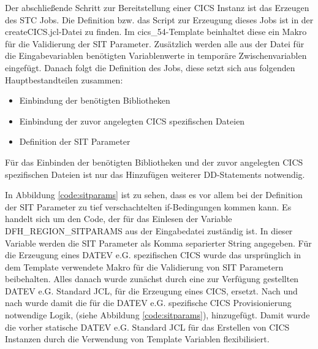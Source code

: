 \begin{minipage}{\linewidth}

\end{minipage}

Der abschließende Schritt zur Bereitstellung einer CICS Instanz ist das Erzeugen des STC Jobs.
Die Definition bzw. das Script zur Erzeugung dieses Jobs ist in der \glqq createCICS.jcl\grqq-Datei zu finden.
Im \glqq cics\_54\grqq-Template beinhaltet diese ein Makro für die Validierung der SIT Parameter.
Zusätzlich werden alle aus der Datei für die Eingabevariablen benötigten Variablenwerte in temporäre Zwischenvariablen eingefügt.
Danach folgt die Definition des Jobs, diese setzt sich aus folgenden Hauptbestandteilen zusammen:

\begin{itemize}
\item Einbindung der benötigten Bibliotheken
\item Einbindung der zuvor angelegten CICS spezifischen Dateien
\item Definition der SIT Parameter
\end{itemize}

Für das Einbinden der benötigten Bibliotheken und der zuvor angelegten CICS spezifischen Dateien ist nur das Hinzufügen weiterer DD-Statements notwendig.

In Abbildung \ref{code:sitparams} ist zu sehen, dass es vor allem bei der Definition der SIT Parameter zu tief verschachtelten if-Bedingungen kommen kann.
Es handelt sich um den Code, der für das Einlesen der Variable  \glqq DFH\_REGION\_SITPARAMS\grqq{} aus der Eingabedatei zuständig ist.
In dieser Variable werden die SIT Parameter als Komma separierter String angegeben.
Für die Erzeugung eines DATEV e.G. spezifischen CICS wurde das ursprünglich in dem Template verwendete Makro für die Validierung von SIT Parametern beibehalten.
Alles danach wurde zunächst durch eine zur Verfügung gestellten DATEV e.G. Standard JCL, für die Erzeugung eines CICS, ersetzt.
Nach und nach wurde damit die für die DATEV e.G. spezifische CICS Provisionierung notwendige Logik, (siehe Abbildung \ref{code:sitparams}), hinzugefügt.
Damit wurde die vorher statische DATEV e.G. Standard JCL für das Erstellen von CICS Instanzen durch die Verwendung von Template  Variablen flexibilisiert.

\begin{minipage}{\linewidth}

\end{minipage}

